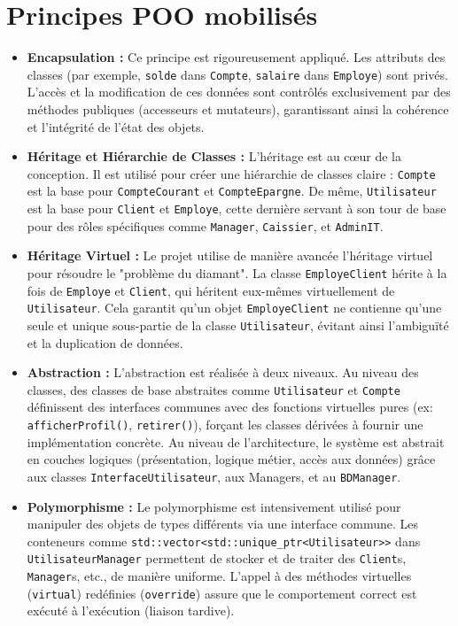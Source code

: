 \section{Principes POO mobilisés}
\begin{itemize}[leftmargin=*]
  \item \textbf{Encapsulation :} Ce principe est rigoureusement appliqué. Les attributs des classes (par exemple, \texttt{solde} dans \texttt{Compte}, \texttt{salaire} dans \texttt{Employe}) sont privés. L'accès et la modification de ces données sont contrôlés exclusivement par des méthodes publiques (accesseurs et mutateurs), garantissant ainsi la cohérence et l'intégrité de l'état des objets.

  \item \textbf{Héritage et Hiérarchie de Classes :} L'héritage est au cœur de la conception. Il est utilisé pour créer une hiérarchie de classes claire : \texttt{Compte} est la base pour \texttt{CompteCourant} et \texttt{CompteEpargne}. De même, \texttt{Utilisateur} est la base pour \texttt{Client} et \texttt{Employe}, cette dernière servant à son tour de base pour des rôles spécifiques comme \texttt{Manager}, \texttt{Caissier}, et \texttt{AdminIT}.

  \item \textbf{Héritage Virtuel :} Le projet utilise de manière avancée l'héritage virtuel pour résoudre le "problème du diamant". La classe \texttt{EmployeClient} hérite à la fois de \texttt{Employe} et \texttt{Client}, qui héritent eux-mêmes virtuellement de \texttt{Utilisateur}. Cela garantit qu'un objet \texttt{EmployeClient} ne contienne qu'une seule et unique sous-partie de la classe \texttt{Utilisateur}, évitant ainsi l'ambiguïté et la duplication de données.

  \item \textbf{Abstraction :} L'abstraction est réalisée à deux niveaux. Au niveau des classes, des classes de base abstraites comme \texttt{Utilisateur} et \texttt{Compte} définissent des interfaces communes avec des fonctions virtuelles pures (ex: \texttt{afficherProfil()}, \texttt{retirer()}), forçant les classes dérivées à fournir une implémentation concrète. Au niveau de l'architecture, le système est abstrait en couches logiques (présentation, logique métier, accès aux données) grâce aux classes \texttt{InterfaceUtilisateur}, aux Managers, et au \texttt{BDManager}.

  \item \textbf{Polymorphisme :} Le polymorphisme est intensivement utilisé pour manipuler des objets de types différents via une interface commune. Les conteneurs comme \texttt{std::vector<std::unique\_ptr<Utilisateur>>} dans \texttt{UtilisateurManager} permettent de stocker et de traiter des \texttt{Client}s, \texttt{Manager}s, etc., de manière uniforme. L'appel à des méthodes virtuelles (\texttt{virtual}) redéfinies (\texttt{override}) assure que le comportement correct est exécuté à l'exécution (liaison tardive).


\end{itemize}
